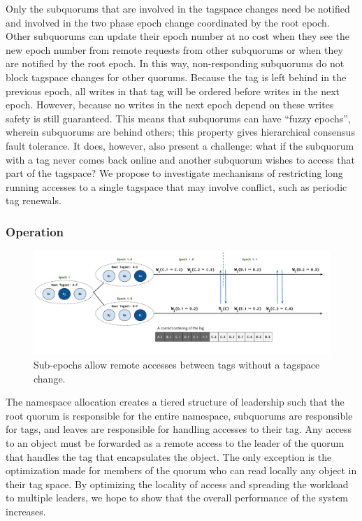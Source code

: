 \documentclass{article}
\begin{document}
Only the subquorums that are involved in the tagspace changes need be notified and involved in the two phase epoch change coordinated by the root epoch. Other subquorums can update their epoch number at no cost when they see the new epoch number from remote requests from other subquorums or when they are notified by the root epoch. In this way, non-responding subquorums do not block tagspace changes for other quorums. Because the tag is left behind in the previous epoch, all writes in that tag will be ordered before writes in the next epoch. However, because no writes in the next epoch depend on these writes safety is still guaranteed. This means that subquorums can have ``fuzzy epochs'', wherein subquorums are behind others; this property gives hierarchical consensus fault tolerance. It does, however, also present a challenge: what if the subquorum with a tag never comes back online and another subquorum wishes to access that part of the tagspace? We propose to investigate mechanisms of restricting long running accesses to a single tagspace that may involve conflict, such as periodic tag renewals.

\subsubsection{Operation}
\label{sec:hierarchical_operation}

\begin{figure}
    \centering
        \includegraphics[width=.9\textwidth]{figures/subepoch}
        \caption{Sub-epochs allow remote accesses between tags without a tagspace change.}
        \label{fig:subepoch}
\end{figure}

The namespace allocation creates a tiered structure of leadership such that the root quorum is responsible for the entire namespace, subquorums are responsible for tags, and leaves are responsible for handling accesses to their tag. Any access to an object must be forwarded as a remote access to the leader of the quorum that handles the tag that encapsulates the object. The only exception is the optimization made for members of the quorum who can read locally any object in their tag space. By optimizing the locality of access and spreading the workload to multiple leaders, we hope to show that the overall performance of the system increases.
\end{document}
